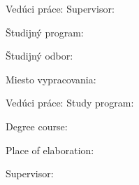 

\ifx\FIITlagEN\undefined
Vedúci práce: \FIITsupervisor
\else
Supervisor: \FIITsupervisor
\fi

\medskip{}

\ifx\FIITlagEN\undefined
\FIITdateSK
\else
\FIITdate
\fi

\emptypage



\ifx\FIITlagEN\undefined
Študijný program: \quad\quad\quad\FIITstudyProgramSK

Študijný odbor: \quad\quad\quad\quad\FIITdegreeCourseSK

Miesto vypracovania:\quad\quad\FIITinstituteSK

Vedúci práce: \quad\quad\quad\quad\quad\FIITsupervisor
\else
Study program:              \quad\FIITstudyProgram

Degree course:              \quad\FIITdegreeCourse

Place of elaboration:       \quad\FIITinstitute

Supervisor:                 \quad\FIITsupervisor
\fi

\medskip{}

\ifx\FIITlagEN\undefined
\FIITdateSK
\else
\FIITdate
\fi

\emptypage
